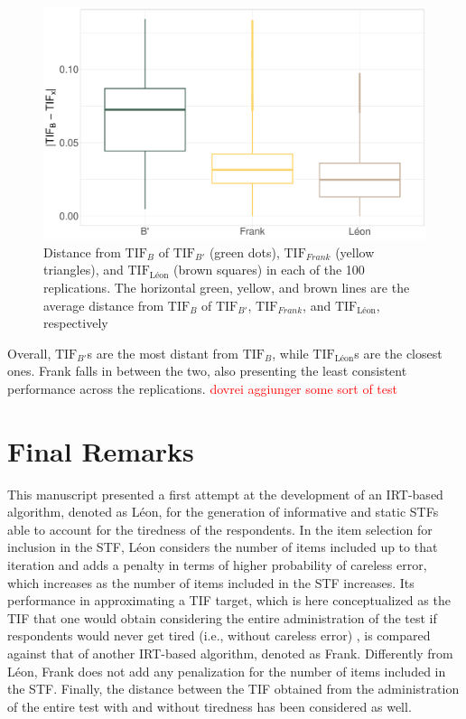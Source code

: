 \documentclass{svproc}
\newcommand{\ottavia}[1]{\textcolor{red}{#1}}
\begin{document}
\begin{figure}[!h]
	\centering
	\includegraphics[width=\linewidth]{img/box-plot-alogirthms}
	\caption{Distance from $\text{TIF}_{B}$ of $\text{TIF}_{B'}$ (green dots), $\text{TIF}_{Frank}$ (yellow triangles), and $\text{TIF}_{\text{Léon}}$ (brown squares) in each of the 100 replications. The horizontal green, yellow, and brown lines are the average distance from $\text{TIF}_B$ of $\text{TIF}_{B'}$, $\text{TIF}_{Frank}$, and $\text{TIF}_{\text{Léon}}$, respectively}
	\label{fig:points-alogirthms}
\end{figure}

Overall, $\text{TIF}_{B'}$s are the most distant from $\text{TIF}_B$, while $\text{TIF}_{\text{Léon}}$s are the closest ones. Frank falls in between the two, also presenting the least consistent performance across the replications. \ottavia{dovrei aggiunger some sort of test}

\section{Final Remarks}

This manuscript presented a first attempt at the development of an IRT-based algorithm, denoted as Léon, for the generation of informative and static STFs able to account for the tiredness of the respondents. In the item selection for inclusion in the STF, Léon considers the number of items included up to that iteration and adds a penalty in terms of higher probability of careless error, which increases as the number of items included in the STF increases. Its performance in approximating a TIF target, which is here conceptualized as the TIF that one would obtain considering the entire administration of the test if respondents would never get tired (i.e., without careless error) , is compared against that of another IRT-based algorithm, denoted as Frank. Differently from Léon, Frank does not add any penalization for the number of items included in the STF. Finally, the distance between the TIF obtained from the administration of the entire test with and without tiredness has been considered as well. 
\end{document}
